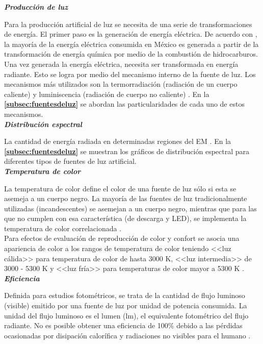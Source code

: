 \textit{\textbf{Producción de luz}}

Para la producción artificial de luz se necesita de una serie de transformaciones de energía. El primer paso es la generación de energía eléctrica. De acuerdo con \cite{Ramos2012}, la mayoría de la energía eléctrica consumida en México es generada a partir de la transformación de energía química por medio de la combustión de hidrocarburos.\\

Una vez generada la energía eléctrica, necesita ser transformada en energía radiante. Esto se logra por medio del mecanismo interno de la fuente de luz. Los mecanismos más utilizados son la termorradiación (radiación de un cuerpo caliente) y luminiscencia (radiación de cuerpo no caliente) \citep{LibroCL}. En la \textbf{\autoref{subsec:fuentesdeluz}} se abordan las particularidades de cada uno de estos mecanismos.\\


\textit{\textbf{Distribución espectral}}

La cantidad de energía radiada en determinadas regiones del EM \citep{Solano2013}. En la \textbf{\autoref{subsec:fuentesdeluz}} se muestran los gráficos de distribución espectral para diferentes tipos de fuentes de luz artificial.\\

  
\textit{\textbf{Temperatura de color}}

La temperatura de color define el color de una fuente de luz sólo si esta se asemeja a un cuerpo negro. La mayoría de las fuentes de luz tradicionalmente utilizadas (incandescentes) se asemejan a un cuerpo negro, mientras que para las que no cumplen con esa característica (de descarga y LED), se implementa la temperatura de color correlacionada \citep{LibroCL}.\\

Para efectos de evaluación de reproducción de color y confort se asocia una apariencia de color a los rangos de temperatura de color teniendo <<luz cálida>> para temperatura de color de hasta 3000 K, <<luz intermedia>> de 3000 - 5300 K y <<luz fría>> para temperaturas de color mayor a 5300 K \citep{Globaldiscussion}.\\


\textit{\textbf{Eficiencia}}

Definida para estudios fotométricos, se trata de la cantidad de flujo luminoso (visible) emitido por una fuente de luz por unidad de potencia consumida. La unidad del flujo luminoso es el lumen (lm), el equivalente fotométrico del flujo radiante. No es posible obtener una eficiencia de 100$\%$ debido a las pérdidas ocasionadas por disipación calorífica y radiaciones no visibles para el humano \citep{LibroCL}.


